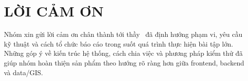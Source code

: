 \documentclass[../DoAn.tex]{subfiles}
\begin{document}
\chapter*{LỜI CẢM ƠN}
Nhóm xin gửi lời cảm ơn chân thành tới thầy \INSTRUCTOR\ đã định hướng phạm vi, yêu cầu kỹ thuật và cách tổ chức báo cáo trong suốt quá trình thực hiện bài tập lớn. Những góp ý về kiến trúc hệ thống, cách chia việc và phương pháp kiểm thử đã giúp nhóm hoàn thiện sản phẩm theo hướng rõ ràng hơn giữa frontend, backend và data/GIS.
\end{document}
